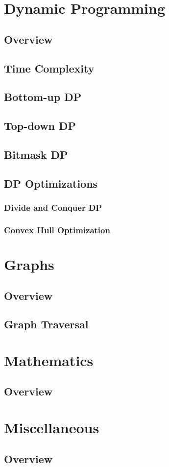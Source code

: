 \documentclass[titlepage]{article}
\begin{document}
\newpage

\section{Dynamic Programming}
\subsection{Overview}
\subsection{Time Complexity}
\subsection{Bottom-up DP}
\subsection{Top-down DP}
\subsection{Bitmask DP}
\subsection{DP Optimizations}
\subsubsection{Divide and Conquer DP}
\subsubsection{Convex Hull Optimization}

\newpage

\section{Graphs}
\subsection{Overview}
\subsection{Graph Traversal}

\newpage

\section{Mathematics}
\subsection{Overview}

\newpage

\section{Miscellaneous}
\subsection{Overview}

\newpage
\end{document}
